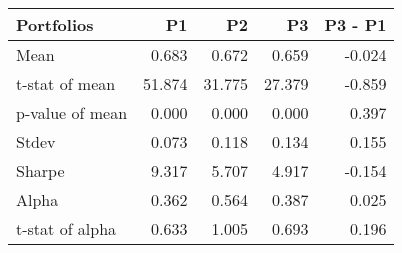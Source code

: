 \begin{tabular}{lrrrr}
\toprule
Portfolios & P1 & P2 & P3 & P3 - P1 \\
\midrule
Mean & 0.683 & 0.672 & 0.659 & -0.024 \\
t-stat of mean & 51.874 & 31.775 & 27.379 & -0.859 \\
p-value of mean & 0.000 & 0.000 & 0.000 & 0.397 \\
Stdev & 0.073 & 0.118 & 0.134 & 0.155 \\
Sharpe & 9.317 & 5.707 & 4.917 & -0.154 \\
Alpha & 0.362 & 0.564 & 0.387 & 0.025 \\
t-stat of alpha & 0.633 & 1.005 & 0.693 & 0.196 \\
\bottomrule
\end{tabular}
